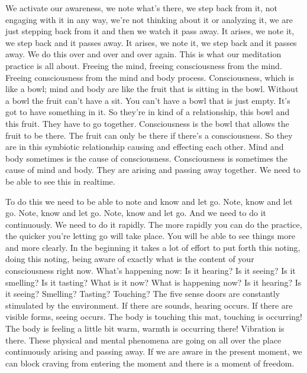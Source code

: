 \documentclass[letterpaper,10pt,english]{sphinxmanual}
\begin{document}
\sphinxAtStartPar
We activate our awareness, we note what’s there, we step back from it,
not engaging with it in any way, we’re not thinking about it or analyzing it,
we are just stepping back from it and then we watch it pass away. It arises,
we note it, we step back and it passes away. It arises, we note it, we step back
and it passes away. We do this over and over and over again. This is what
our  meditation  practice  is  all  about.  Freeing  the  mind,  freeing  consciousness from the mind. Freeing consciousness from the mind and body process.
Consciousness, which is like a bowl; mind and body are like the fruit that
is  sitting  in  the  bowl. Without  a  bowl  the  fruit  can’t  have  a  sit. You  can’t
have a bowl that is just empty. It’s got to have something in it. So they’re
  in kind of a relationship, this bowl and this fruit. They have to go together.
Consciousness is the bowl that allows the fruit to be there. The fruit can only
be there if there’s a consciousness. So they are in this symbiotic relationship
causing and effecting each other. Mind and body sometimes is the cause of
consciousness.  Consciousness  is  sometimes  the  cause  of  mind  and  body.
They are arising and passing away together. We need to be able to see this
in real\sphinxhyphen{}time.

\sphinxAtStartPar
To do this we need to be able to note and know and let go. Note, know
and let go. Note, know and let go. Note, know and let go. And we need to
do it continuously. We need to do it rapidly. The more rapidly you can do
the practice, the quicker you’re letting go will take place. You will be able
to see things more and more clearly. In the beginning it takes a lot of effort
to  put  forth  this  noting,  doing  this  noting,  being  aware  of  exactly  what  is
the  content  of  your  consciousness  right  now. What’s  happening  now:  Is  it
hearing? Is it seeing? Is it smelling? Is it tasting? What is it now? What is
happening now? Is it hearing? Is it seeing? Smelling? Tasting? Touching?
The five sense doors are constantly stimulated by the environment. If there
are  sounds,  hearing  occurs.  If  there  are  visible  forms,  seeing  occurs.  The
body is touching this mat, touching is occurring! The body is feeling a little
bit warm, warmth is occurring there! Vibration is there. These physical and
mental phenomena are going on all over the place continuously arising and
passing away. If we are aware in the present moment, we can block craving
from entering the moment and there is a moment of freedom.
\end{document}
